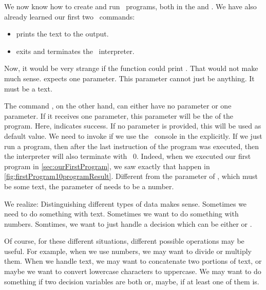 %
%
We now know how to create and run \python\ programs, both in the  and .
We have also already learned our first two \python\ commands:%
%
\begin{itemize}%
\item {} prints the text  to the output.
\item {} exits and terminates the \python\ interpreter.%
\end{itemize}%
%
Now, it would be very strange if the  function could print .
That would not make much sense.
 expects one parameter.
This parameter cannot just be anything.
It must be a text.

The command , on the other hand, can either have no parameter or one parameter.
If it receives one parameter, this parameter will be the  of the program.
Here,  indicates success.
If no parameter is provided, this will be used as default value.
We need to invoke  if we use the \python\ console in the  explicitly.
If we just run a program, then after the last instruction of the program was executed, then the interpreter will also terminate with ~0.
Indeed, when we executed our first program in \cref{sec:ourFirstProgram}, we saw exactly that happen in \cref{fig:firstProgram10programResult}.
Different from the parameter of , which must be some text, the parameter of  needs to be a number.

We realize:
Distinguishing different types of data makes sense.
Sometimes we need to do something with text.
Sometimes we want to do something with numbers.
Somtimes, we want to just handle a decision which can be either  or .

Of course, for these different situations, different possible operations may be useful.
For example, when we use numbers, we may want to divide or multiply them.
When we handle text, we may want to concatenate two portions of text, or maybe we want to convert lowercase characters to uppercase.
We may want to do something if two decision variables are both  or, maybe, if at least one of them is.

